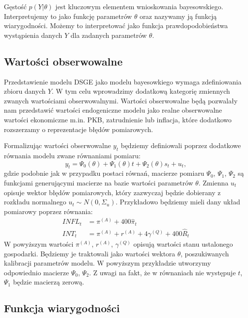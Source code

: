 Gęstość $p(Y|\theta)$ jest kluczowym elementem wnioskowania bayesowskiego. Interpretujemy to jako funkcję parametrów $\theta$ oraz nazywamy ją funkcją wiarygodności. Możemy to interpretować jako funkcja prawdopodobieństwa wystąpienia danych $Y$ dla zadanych parametrów $\theta$.

\subsection{Wartości obserwowalne}
\label{sec:observable}

Przedstawienie modelu DSGE jako modelu bayesowkiego wymaga zdefiniowania zbioru danych $Y$. W tym celu wprowadzimy dodatkową kategorię zmiennych zwanych wartościami obserwowalnymi. Wartości obserwowalne będą pozwalały nam przedstawić wartości endogeniczne modelu jako realne obserwowalne wartości ekonomiczne m.in. PKB, zatrudnienie lub inflacja, które dodatkowo rozszerzamy o reprezentacje błędów pomiarowych.

Formalizując wartości obserwowalne $y_t$ będziemy definiowali poprzez dodatkowe równania modelu zwane równaniami pomiaru:
\begin{equation}
\label{eqn:measurement}
    y_t=\Psi_0(\theta) + \Psi_1(\theta)t + \Psi_2(\theta)s_t + u_t,
\end{equation}
gdzie podobnie jak w przypadku postaci równań, macierze pomiaru $\Psi_0$, $\Psi_1$, $\Psi_2$ są funkcjami generującymi macierze na bazie wartości parametrów $\theta$. Zmienna $u_t$ opisuje wektor błędów pomiarowych, który zazwyczaj będzie dobierany z rozkładu normalnego $u_t \sim N(0, \Sigma_{u})$. Przykładowo będziemy mieli dany układ pomiarowy poprzez równania:
\begin{align}
        INFL_t &= \pi^{(A)} + 400 \hat{\pi}_t \\
        INT_t &= \pi^{(A)} + r^{(A)} + 4\gamma^{(Q)} + 400 \hat{R}_t
\end{align}
W powyższym wartości $\pi^{(A)}$, $r^{(A)}$, $\gamma^{(Q)} $ opisują wartości stanu ustalonego gospodarki. Będziemy je traktowali jako wartości wektora $\theta$, poszukiwanych kalibracji parametrów modelu. W powyższym przykładzie utworzymy odpowiednio macierze $\Psi_0$, $\Psi_2$. Z uwagi na fakt, że w równaniach nie występuje $t$, $\Psi_1$ będzie macierzą zerową.

\subsection{Funkcja wiarygodności}
\label{sec:likelihood}


